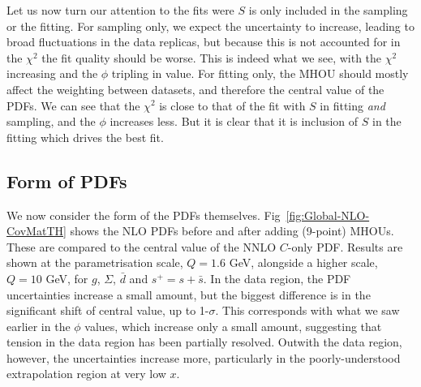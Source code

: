 Let us now turn our attention to the fits were $S$ is only included in the sampling or the fitting. For sampling only, we expect the uncertainty to increase, leading to broad fluctuations in the data replicas, but because this is not accounted for in the $\chi^2$ the fit quality should be worse. This is indeed what we see, with the $\chi^2$ increasing and the $\phi$ tripling in value.  For fitting only, the MHOU should mostly affect the weighting between datasets, and therefore the central value of the PDFs. We can see that the $\chi^2$ is close to that of the fit with $S$ in fitting \textit{and} sampling, and the $\phi$ increases less. But it is clear that it is inclusion of $S$ in the fitting which drives the best fit.

\subsection{Form of PDFs}
We now consider the form of the PDFs themselves. Fig~\ref{fig:Global-NLO-CovMatTH} shows the NLO PDFs before and after adding (9-point) MHOUs. These are compared to the central value of the NNLO $C$-only PDF. Results are shown at the parametrisation scale, $Q=1.6$ GeV, alongside a higher scale, $Q=10$ GeV, for $g$, $\Sigma$, $\bar{d}$ and $s^+ = s + \bar{s}$. In the data region, the PDF uncertainties increase a small amount, but the biggest difference is in the significant shift of central value, up to 1-$\sigma$. This corresponds with what we saw earlier in the $\phi$ values, which increase only a small amount, suggesting that tension in the data region has been partially resolved. Outwith the data region, however, the uncertainties increase more, particularly in the poorly-understood extrapolation region at very low $x$.
